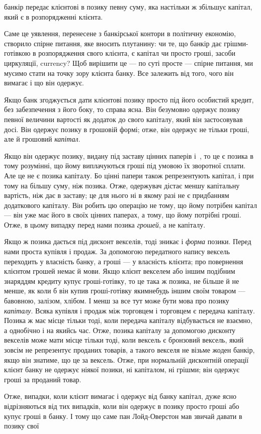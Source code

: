 \parcont{}  %
банкір передає клієнтові в позику певну суму, яка настільки ж
збільшує капітал, який є в розпорядженні клієнта.

Саме це уявлення, перенесене з банкірської контори в політичну економію, створило спірне питання,
яке вносить плутанину: чи те, що банкір дає грішми-готівкою в розпорядження
свого клієнта, є капітал чи просто гроші, засоби циркуляції,
currency? Щоб вирішити це — по суті просте — спірне питання,
ми мусимо стати на точку зору клієнта банку. Все залежить
від того, чого він вимагає і що він одержує.

Якщо банк згоджується дати клієнтові позику просто під
його особистий кредит, без забезпечення з його боку, то справа
ясна. Він безумовно одержує позику певної величини вартості
як додаток до свого капіталу, який він застосовував досі. Він
одержує позику в грошовій формі; отже, він одержує не тільки
гроші, але й грошовий \emph{капітал}.

Якщо він одержує позику, видану під заставу цінних паперів і~, то це є позика в тому розумінні,
що йому виплачуються гроші під умовою їх зворотної сплати. Але це не є
позика капіталу. Бо цінні папери також репрезентують капітал,
і при тому на більшу суму, ніж позика. Отже, одержувач дістає меншу капітальну вартість, ніж дає в
заставу; це для нього
ні в якому разі не є придбанням додаткового капіталу. Він робить цю операцію не тому, що йому
потрібен капітал — він уже
має його в своїх цінних паперах, а тому, що йому потрібні гроші.
Отже, в цьому випадку перед нами позика \emph{грошей}, а не капіталу.

Якщо ж позика дається під дисконт векселів, тоді зникає і \emph{форма}
позики. Перед нами проста купівля і продаж. За допомогою передатного напису вексель переходить у
власність банку, а гроші — у власність клієнта; про повернення клієнтом грошей немає й мови. Якщо
клієнт векселем або іншим подібним знаряддям
кредиту купує гроші-готівку, то це така ж позика, не більше
й не менше, як коли б він купив гроші-готівку якимнебудь
іншим своїм товаром — бавовною, залізом, хлібом. І менш за
все тут може бути мова про позику \emph{капіталу}. Всяка купівля і продаж між торговцем і торговцем є
передача капіталу.
Позика ж має місце тільки тоді, коли передача капіталу відбувається не взаємно, а однобічно і на
якийсь час. Отже, позика
капіталу за допомогою дисконту векселів може мати місце
тільки тоді, коли вексель є бронзовий вексель, який зовсім не
репрезентує проданих товарів, а такого векселя не візьме жоден
банкір, якщо він знатиме, що це за вексель. Отже, при нормальній дисконтній операції клієнт банку не
одержує ніякої позики,
ні капіталом, ні грішми; він одержує гроші за проданий товар.

Отже, випадки, коли клієнт вимагає і одержує від банку
капітал, дуже ясно відрізняються від тих випадків, коли він
одержує в позику просто гроші або купує гроші в банку. І тому
що саме пан Лойд-Оверстон мав звичай давати в позику свої
\parbreak{}  %
